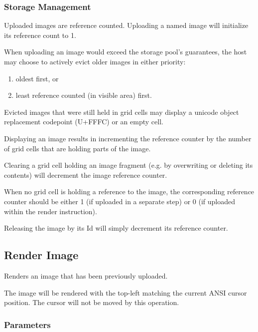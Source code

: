 \documentclass{article}
\begin{document}
\subsubsection{Storage Management}

Uploaded images are reference counted. Uploading a named image will initialize its reference count to 1.

When uploading an image would exceed the storage pool's guarantees,
the host may choose to actively evict older images in either priority:

\begin{enumerate}
    \item oldest first, or
    \item least reference counted (in visible area) first.
\end{enumerate}

Evicted images that were still held in grid cells may display a unicode object replacement
codepoint (U+FFFC) or an empty cell.

Displaying an image results in incrementing the reference counter by the number of grid cells
that are holding parts of the image.

Clearing a grid cell holding an image fragment (e.g. by overwriting or deleting its contents)
will decrement the image reference counter.

When no grid cell is holding a reference to the image,
the corresponding reference counter should be either 1 (if uploaded in a separate step)
or 0 (if uploaded within the render instruction).

Releasing the image by its Id will simply decrement its reference counter.

\subsection{Render Image}

Renders an image that has been previously uploaded.

The image will be rendered with the top-left matching the current ANSI cursor position.
The cursor will not be moved by this operation.

\subsubsection*{Parameters}
\end{document}
